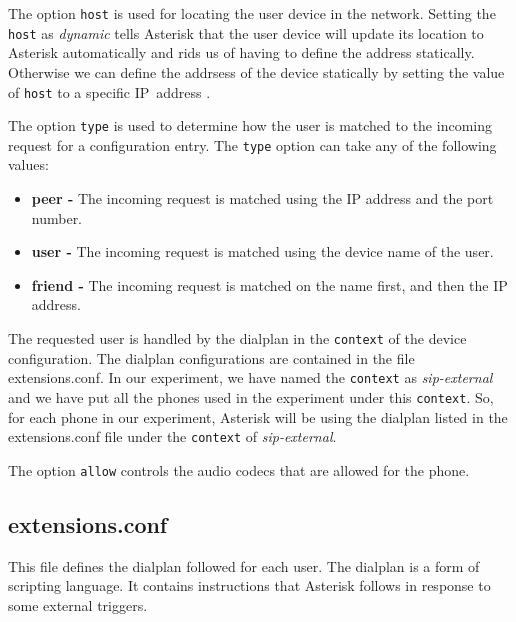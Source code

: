The option \texttt{host} is used for locating the user device in the network.
Setting the \texttt{host} as \textsl{dynamic} tells Asterisk that the user
device will update its location to Asterisk automatically and rids us of having
to define the address statically. Otherwise we can define the addrsess of the
device statically by setting the value of \texttt{host} to a specific 
IP~address \cite{docAstrsk}.

The option \texttt{type} is used to determine how the user is matched to the 
incoming request for a configuration entry. The \texttt{type} option can take any 
of the following values:
\begin{itemize}[noitemsep,topsep=0pt,parsep=0pt,partopsep=0pt]
    \item \textbf{peer -} The incoming request is matched using the IP
    address and the port number.
    \item \textbf{user -} The incoming request is matched using the 
    device name of the user.
    \item \textbf{friend -} The incoming request is matched on the name first,
    and then the IP address.
\end{itemize}

The requested user is handled by the dialplan in the \texttt{context} of the
device configuration. The dialplan configurations are contained in the
file \textsf{extensions.conf}. In our experiment, we have named the
\texttt{context} as \textsl{sip-external} and we have put all the phones used
in the experiment under this \texttt{context}. So, for each phone in our
experiment, Asterisk will be using the dialplan listed in the
\textsf{extensions.conf} file under the \texttt{context} of
\textsl{sip-external}.


The option \texttt{allow} controls the audio codecs that are allowed for the
phone.


\subsection{extensions.conf}

This file defines the dialplan followed for each user. The dialplan is a form
of scripting language. It contains instructions that Asterisk follows in 
response to some external triggers.

